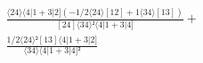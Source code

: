 \documentclass[varwidth, border=5pt]{standalone}
\begin{document}
\begin{my}
$\begin{gathered}
\scriptscriptstyle\frac{⟨24⟩⟨4|1+3|2](-1/2⟨24⟩[12]+1⟨34⟩[13])}{[24]⟨34⟩²⟨4|1+3|4]} +\\
\scriptscriptstyle\frac{1/2⟨24⟩²[13]⟨4|1+3|2]}{⟨34⟩⟨4|1+3|4]²} \phantom{+}
\end{gathered}$
\end{my}
\end{document}
